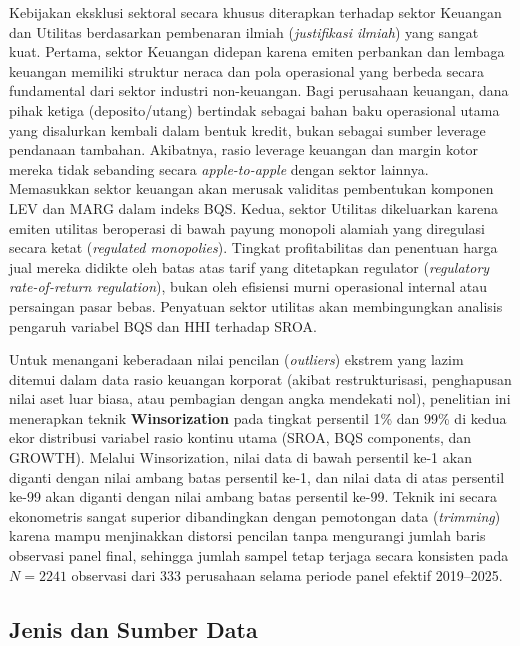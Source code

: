 \documentclass[12pt,a4paper]{article}
\begin{document}
Kebijakan eksklusi sektoral secara khusus diterapkan terhadap sektor
Keuangan dan Utilitas berdasarkan pembenaran ilmiah (\emph{justifikasi
ilmiah}) yang sangat kuat. Pertama, sektor Keuangan didepan karena
emiten perbankan dan lembaga keuangan memiliki struktur neraca dan pola
operasional yang berbeda secara fundamental dari sektor industri
non-keuangan. Bagi perusahaan keuangan, dana pihak ketiga
(deposito/utang) bertindak sebagai bahan baku operasional utama yang
disalurkan kembali dalam bentuk kredit, bukan sebagai sumber leverage
pendanaan tambahan. Akibatnya, rasio leverage keuangan dan margin kotor
mereka tidak sebanding secara \emph{apple-to-apple} dengan sektor
lainnya. Memasukkan sektor keuangan akan merusak validitas pembentukan
komponen LEV dan MARG dalam indeks BQS. Kedua, sektor Utilitas
dikeluarkan karena emiten utilitas beroperasi di bawah payung monopoli
alamiah yang diregulasi secara ketat (\emph{regulated monopolies}).
Tingkat profitabilitas dan penentuan harga jual mereka didikte oleh
batas atas tarif yang ditetapkan regulator (\emph{regulatory
rate-of-return regulation}), bukan oleh efisiensi murni operasional
internal atau persaingan pasar bebas. Penyatuan sektor utilitas akan
membingungkan analisis pengaruh variabel BQS dan HHI terhadap SROA.

Untuk menangani keberadaan nilai pencilan (\emph{outliers}) ekstrem yang
lazim ditemui dalam data rasio keuangan korporat (akibat
restrukturisasi, penghapusan nilai aset luar biasa, atau pembagian
dengan angka mendekati nol), penelitian ini menerapkan teknik
\textbf{Winsorization} pada tingkat persentil 1\% dan 99\% di kedua ekor
distribusi variabel rasio kontinu utama (SROA, BQS components, dan
GROWTH). Melalui Winsorization, nilai data di bawah persentil ke-1 akan
diganti dengan nilai ambang batas persentil ke-1, dan nilai data di atas
persentil ke-99 akan diganti dengan nilai ambang batas persentil ke-99.
Teknik ini secara ekonometris sangat superior dibandingkan dengan
pemotongan data (\emph{trimming}) karena mampu menjinakkan distorsi
pencilan tanpa mengurangi jumlah baris observasi panel final, sehingga
jumlah sampel tetap terjaga secara konsisten pada \(N = 2241\) observasi
dari 333 perusahaan selama periode panel efektif 2019--2025.

\subsection{Jenis dan Sumber Data}\label{jenis-dan-sumber-data}
\end{document}
